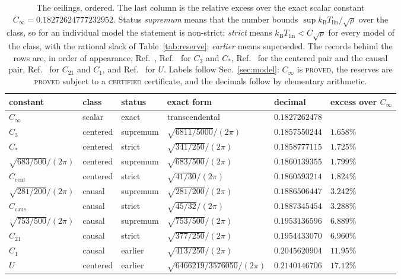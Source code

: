 \documentclass[aps,10pt,superscriptaddress,floatfix,amsmath,amssymb,nofootinbib]{revtex4-2}
\newcommand{\kb}{k_{\mathrm B}}
\newcommand{\Tlin}{T_{\mathrm{lin}}}
\newcommand{\Cinf}{C_\infty}
\newcommand{\Cthree}{C_{3}}
\newcommand{\Cstar}{C_{*}}
\newcommand{\Ccent}{C_{\mathrm{cent}}}
\newcommand{\Ccaus}{C_{\mathrm{caus}}}
\newcommand{\Ctwoone}{C_{21}}
\newcommand{\Cone}{C_{1}}
\newcommand{\Upre}{U}
\newcommand{\PROVED}{\textsc{proved}}
\newcommand{\CERT}{\textsc{certified}}
\begin{document}
\begin{table}[h]
\caption{The ceilings, ordered. The last column is the relative excess over the exact scalar
constant $\Cinf=0.18272624777232952$. Status \emph{supremum} means that the number bounds
$\sup\kb\Tlin/\sqrt\rho$ over the class, so for an individual model the statement is
non-strict; \emph{strict} means $\kb\Tlin<C\sqrt\rho$ for every model of the class, with the
rational slack of Table~\ref{tab:reserve}; \emph{earlier} means superseded. The records
behind the rows are, in order of appearance, Ref.~\cite{gamma}, Ref.~\cite{anisosharp} for
$\Cthree$ and $\Cstar$, Ref.~\cite{finiteenergy} for the centered pair and the causal pair,
Ref.~\cite{optimum} for $\Ctwoone$ and $\Cone$, and Ref.~\cite{univglue} for $\Upre$. Labels
follow Sec.~\ref{sec:model}: $\Cinf$ is \PROVED{}, the reserves are \PROVED{} subject to a
\CERT{} certificate, and the decimals follow by elementary arithmetic.\label{tab:ceil}}
\small
\begin{tabular}{@{}llllll@{}}
\hline
constant & class & status & exact form & decimal & excess over $\Cinf$ \\
\hline
$\Cinf$ & scalar & exact & transcendental & $0.1827262478$ & \\
$\Cthree$ & centered & supremum & $\sqrt{6811/5000}/(2\pi)$ & $0.1857550244$ & $1.658\%$ \\
$\Cstar$ & centered & strict & $\sqrt{341/250}/(2\pi)$ & $0.1858777115$ & $1.725\%$ \\
$\sqrt{683/500}/(2\pi)$ & centered & supremum & $\sqrt{683/500}/(2\pi)$ & $0.1860139355$ & $1.799\%$ \\
$\Ccent$ & centered & strict & $\sqrt{41/30}/(2\pi)$ & $0.1860593214$ & $1.824\%$ \\
$\sqrt{281/200}/(2\pi)$ & causal & supremum & $\sqrt{281/200}/(2\pi)$ & $0.1886506447$ & $3.242\%$ \\
$\Ccaus$ & causal & strict & $\sqrt{45/32}/(2\pi)$ & $0.1887345454$ & $3.288\%$ \\
$\sqrt{753/500}/(2\pi)$ & causal & supremum & $\sqrt{753/500}/(2\pi)$ & $0.1953136596$ & $6.889\%$ \\
$\Ctwoone$ & causal & strict & $\sqrt{377/250}/(2\pi)$ & $0.1954433070$ & $6.960\%$ \\
$\Cone$ & causal & earlier & $\sqrt{413/250}/(2\pi)$ & $0.2045620904$ & $11.95\%$ \\
$\Upre$ & centered & earlier & $\sqrt{6466219/3576050}/(2\pi)$ & $0.2140146706$ & $17.12\%$ \\
\hline
\end{tabular}
\end{table}
\end{document}
